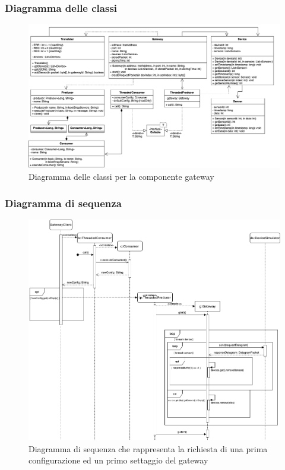 		\begin{landscape}
	\subsubsection{Diagramma delle classi}%
	  	\begin{figure}[H]
			\centering
			\includegraphics[scale=0.500]{res/images/GATEWAY/ClassiGateway.png}
			\caption{Diagramma delle classi per la componente gateway}
			\label{Diagramma 2}
		\end{figure}	
		\end{landscape}
		\begin{landscape}
	\subsubsection{Diagramma di sequenza}%
	  	\begin{figure}[H]
			\centering
			\includegraphics[scale=0.500]{res/images/GATEWAY/RichiestaInvioGateway.png}
			\caption{Diagramma di sequenza che rappresenta la richiesta di una prima configurazione ed un primo settaggio del gateway}
			\label{Diagramma 3}
		\end{figure}
		
		\end{landscape}
